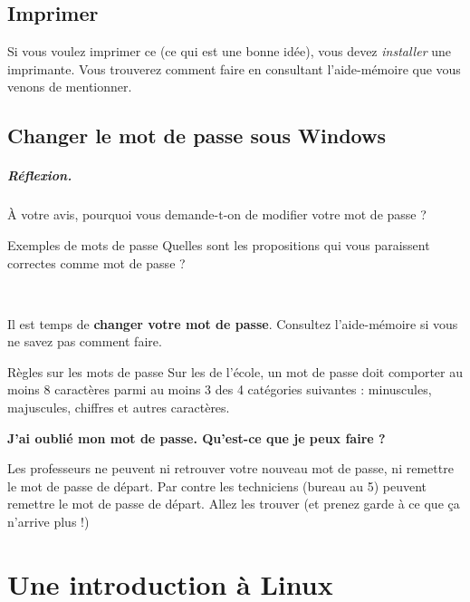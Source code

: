 \documentclass[a4paper,11pt]{style-esi/td}
\begin{document}
	\subsection{Imprimer}

	Si vous voulez imprimer ce  (ce qui est une bonne idée), 
	vous devez \textit{installer} une imprimante. 
	Vous trouverez comment faire en consultant l'aide-mémoire que vous venons de mentionner.
	
	\subsection{Changer le mot de passe sous Windows}

	\subparagraph{Réflexion.}
	À votre avis, pourquoi vous demande-t-on de modifier votre mot de passe ?
				
	\begin{Exercice}{Exemples de mots de passe} 		
		Quelles sont les propositions qui vous paraissent correctes comme mot de passe ?
		\par
		\qquad\checkbox~
		\qquad\checkbox~
		\qquad\checkbox~
		\qquad\checkbox~
	\end{Exercice} 
 
	Il est  temps de \textbf{changer votre mot de passe}. 
	Consultez l'aide-mémoire si vous ne savez pas comment faire. 
			
	\begin{infotbox}{Règles sur les mots de passe}
		Sur les  de l'école,
		un mot de passe doit comporter au moins 8 caractères
		parmi au moins 3 des 4 catégories suivantes : 
		minuscules, majuscules, chiffres et autres caractères.
	\end{infotbox}

	\begin{faq}
		\textbf{J'ai oublié mon mot de passe. Qu'est-ce que je peux faire ?}
		\par
		Les professeurs ne peuvent ni retrouver votre nouveau mot de passe, 
		ni remettre le mot de passe de départ. 
		Par contre les techniciens (bureau au 5\ieme) 
		peuvent remettre le mot de passe de départ. 
		Allez les trouver (et prenez garde à ce que ça n'arrive plus !)
	\end{faq}
	
\newpage
\section{Une introduction à Linux}
\end{document}
